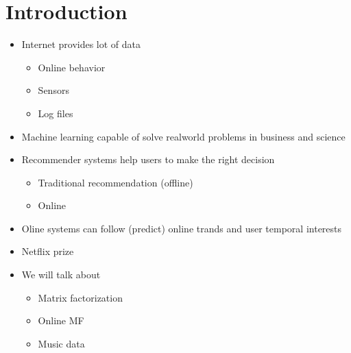 \chapter{Introduction}
\begin{itemize}
\item Internet provides lot of data 
  \begin{itemize}
  \item Online behavior
  \item Sensors
  \item Log files 
  \end{itemize}
\item Machine learning capable of solve realworld problems in business and
  science
\item Recommender systems help users to make the right decision
  \begin{itemize}
  \item Traditional recommendation (offline)
  \item Online 
  \end{itemize}
\item Oline systems can follow (predict) online trands and user temporal
  interests
\item Netflix prize
\item We will talk about
  \begin{itemize}
  \item Matrix factorization
  \item Online MF
  \item Music data 
  \end{itemize}
\end{itemize}
